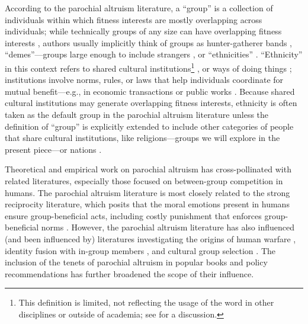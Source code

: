 \documentclass[bibauthoryear]{aa}
\begin{document}
According to the parochial altruism literature, a ``group'' is a collection of individuals within which fitness interests are mostly overlapping across individuals; while technically groups of any size can have overlapping fitness interests \citep{richerson2008not}, authors usually implicitly think of groups as hunter-gatherer bands \citep{bowles2003origins}, ``demes''---groups large enough to include strangers \citep[see][for a discussion]{brewer2006evolutionary}, or ``ethnicities'' \citep{choi2007coevolution}. ``Ethnicity'' in this context refers to shared cultural institutions\footnote{This definition is limited, not reflecting the usage of the word in other disciplines or outside of academia; see \citet{jenkins1994rethinking} for a discussion.} \citep{barth1956ecologic, barth1998ethnic}, or ways of doing things \citep{north1991}; institutions involve norms, rules, or laws that help individuals coordinate for mutual benefit---e.g., in economic transactions or public works \citep{glowacki2020}. Because shared cultural institutions may generate overlapping fitness interests, ethnicity is often taken as the default group in the parochial altruism literature unless the definition of ``group'' is explicitly extended to include other categories of people that share cultural institutions, like religions\citep{purzycki2016moralistic}---groups we will explore in the present piece---or nations \citep{greene2013moral}.

Theoretical and empirical work on parochial altruism has cross-pollinated with related literatures, especially those focused on between-group competition in humans. The parochial altruism literature is most closely related to the strong reciprocity literature, which posits that the moral emotions present in humans ensure group-beneficial acts, including costly punishment that enforces group-beneficial norms \citep{fehr2002strong, fehr2003strong, gintis2008strong}. However, the parochial altruism literature has also influenced (and been influenced by) literatures investigating the origins of human warfare \citep{glowacki2017evolutionary, wrangham2012intergroup, zefferman2015evolutionary}, identity fusion with in-group members \citep{swann2012group,  purzycki2019identity}, and cultural group selection \citep{richerson2016cultural}. The inclusion of the tenets of parochial altruism in popular books \citep{seabright2004company, greene2013moral} and policy recommendations \citep{choi2019parochialism, waring2015} has further broadened the scope of their influence.
\end{document}
